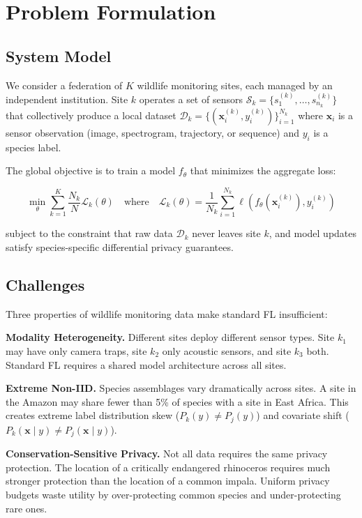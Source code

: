 \documentclass[11pt,a4paper]{article}
\begin{document}
\section{Problem Formulation}
\label{sec:formulation}

\subsection{System Model}

We consider a federation of $K$ wildlife monitoring sites, each managed by an independent institution.
Site $k$ operates a set of sensors $\mathcal{S}_k = \{s_1^{(k)}, \ldots, s_{n_k}^{(k)}\}$ that collectively produce a local dataset $\mathcal{D}_k = \{(\mathbf{x}_i^{(k)}, y_i^{(k)})\}_{i=1}^{N_k}$ where $\mathbf{x}_i$ is a sensor observation (image, spectrogram, trajectory, or sequence) and $y_i$ is a species label.

The global objective is to train a model $f_\theta$ that minimizes the aggregate loss:

\begin{equation}
    \min_\theta \sum_{k=1}^{K} \frac{N_k}{N} \mathcal{L}_k(\theta) \quad \text{where} \quad \mathcal{L}_k(\theta) = \frac{1}{N_k} \sum_{i=1}^{N_k} \ell(f_\theta(\mathbf{x}_i^{(k)}), y_i^{(k)})
\end{equation}

\noindent subject to the constraint that raw data $\mathcal{D}_k$ never leaves site $k$, and model updates satisfy species-specific differential privacy guarantees.

\subsection{Challenges}

Three properties of wildlife monitoring data make standard FL insufficient:

\textbf{Modality Heterogeneity.}
Different sites deploy different sensor types.
Site $k_1$ may have only camera traps, site $k_2$ only acoustic sensors, and site $k_3$ both.
Standard FL requires a shared model architecture across all sites.

\textbf{Extreme Non-IID.}
Species assemblages vary dramatically across sites.
A site in the Amazon may share fewer than 5\% of species with a site in East Africa.
This creates extreme label distribution skew ($P_k(y) \neq P_j(y)$) and covariate shift ($P_k(\mathbf{x} \mid y) \neq P_j(\mathbf{x} \mid y)$).

\textbf{Conservation-Sensitive Privacy.}
Not all data requires the same privacy protection.
The location of a critically endangered rhinoceros requires much stronger protection than the location of a common impala.
Uniform privacy budgets waste utility by over-protecting common species and under-protecting rare ones.
\end{document}

